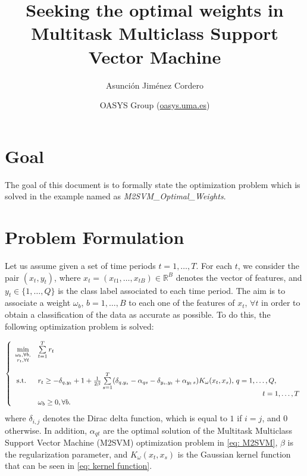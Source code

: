 \documentclass[a4paper,12pt]{article}
\begin{document}
\title{Seeking the optimal weights in Multitask Multiclass Support Vector Machine}

\author{Asunci\'on Jim\'enez Cordero}

\date{\small{OASYS Group (\url{oasys.uma.es})}}

\maketitle

\section{Goal}

The goal of this document is to formally state the optimization problem which is solved in the example named as \emph{M2SVM\_Optimal\_Weights}.

\section{Problem Formulation}

Let us assume given a set of time periods $t = 1, \ldots, T$. For each $t$, we consider the pair $(x_t, y_t)$, where $x_t = (x_{t1}, \ldots, x_{tB}) \in\mathbb{R}^B$ denotes the vector of features, and $y_t\in\{1, \ldots, Q\}$ is the class label associated to each time period. The aim is to associate a weight $\omega_b$, $b = 1, \ldots, B$ to each one of the features of $x_t$, $\forall t$ in order to obtain a classification of the data as accurate as possible. To do this, the following optimization problem is solved:

\begin{equation}\label{eq: optimal weights problem}
  \left\{
  \begin{array}{cl}
   \min\limits_{\substack{\omega_b, \forall b,\\
   r_{t}, \forall t}} &\sum\limits_{t = 1}^T r_{t}\\
   \\
   \text{s.t. }& r_{t}\geq  - \delta_{q, y_{t}} + 1 + \frac{1}{2\beta}\sum\limits_{s = 1}^T(\delta_{q, y_{s}} - \alpha_{qs} - \delta_{y_s, y_t} + \alpha_{y_t\,s})K_{\omega}(x_t, x_s), \,q = 1, \ldots, Q, \\
   &\hspace*{11cm} t = 1, \ldots, T\\
   & \omega_b\geq 0, \forall b.
  \end{array}
    \right.
  \end{equation}
\noindent where $\delta_{i,j}$ denotes the Dirac delta function, which is equal to $1$ if $i = j$, and $0$ otherwise. In addition, $\alpha_{qt}$ are the optimal solution of the Multitask Multiclass Support Vector Machine (M2SVM) optimization problem in \eqref{eq: M2SVM}, $\beta$ is the regularization parameter, and $K_{\omega}(x_t, x_s)$ is the Gaussian kernel function that can be seen in \eqref{eq: kernel function}.
\end{document}
